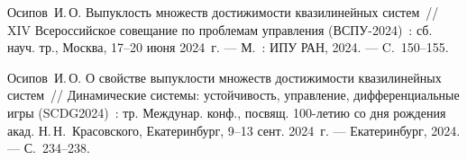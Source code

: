 \documentclass[../main.tex]{subfiles}
\begin{document}
\begin{thebibliography}{99}
Осипов~И.\,О. Выпуклость множеств достижимости квазилинейных систем~// XIV Всероссийское совещание по проблемам управления (ВСПУ-2024)~: сб. науч. тр., Москва, 17--20 июня 2024~г. --- М.~: ИПУ РАН, 2024. --- C.~150--155.

Осипов~И.\,О. О свойстве выпуклости множеств достижимости квазилинейных систем~// Динамические системы: устойчивость, управление, дифференциальные игры (SCDG2024)~: тр. Междунар. конф., посвящ. 100-летию со дня рождения акад. Н.\,Н.~Красовского, Екатеринбург, 9--13 сент. 2024~г. --- Екатеринбург, 2024. --- С.~234--238. 









%


\end{thebibliography}
\end{document}
